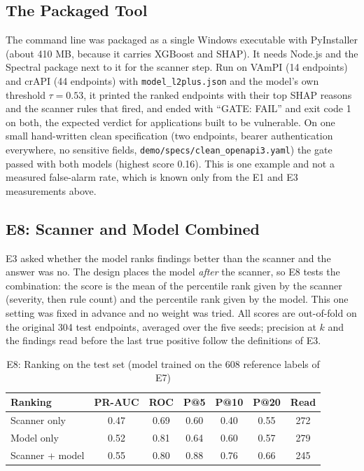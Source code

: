 \documentclass[conference]{IEEEtran}
\begin{document}
\subsection{The Packaged Tool}
The command line was packaged as a single Windows executable with PyInstaller (about 410 MB, because it carries XGBoost and SHAP).
It needs Node.js and the Spectral package next to it for the scanner step. Run on VAmPI (14 endpoints) and crAPI (44 endpoints)
with \texttt{model\_l2plus.json} and the model's own threshold $\tau=0.53$, it printed the ranked endpoints with their top SHAP reasons
and the scanner rules that fired, and ended with ``GATE: FAIL'' and exit code 1 on both, the expected verdict for applications built to
be vulnerable. On one small hand-written clean specification (two endpoints, bearer authentication everywhere, no sensitive fields, \texttt{demo/specs/clean\_openapi3.yaml}) the gate passed with both models (highest score 0.16). This is one example and not a measured false-alarm rate, which is known only from the E1 and E3
measurements above.

\subsection{E8: Scanner and Model Combined}
\label{sec:e8}
E3 asked whether the model ranks findings better than the scanner and the answer was no. The design places the model \emph{after} the scanner, so
E8 tests the combination: the score is the mean of the percentile rank given by the scanner (severity, then rule count) and the percentile rank given by
the model. This one setting was fixed in advance and no weight was tried. All scores are out-of-fold on the original 304 test endpoints, averaged over the five seeds;
precision at $k$ and the findings read before the last true positive follow the definitions of E3.

\begin{table}[!t]
\caption{E8: Ranking on the test set (model trained on the 608 reference labels of E7)}
\label{tab:e8}
\centering
\scriptsize
\begin{tabular}{lcccccc}
\toprule
\textbf{Ranking} & \textbf{PR-AUC} & \textbf{ROC} & \textbf{P@5} & \textbf{P@10} & \textbf{P@20} & \textbf{Read}\\
\midrule
Scanner only & 0.47 & 0.69 & 0.60 & 0.40 & 0.55 & 272\\
Model only & 0.52 & 0.81 & 0.64 & 0.60 & 0.57 & 279\\
Scanner + model & 0.55 & 0.80 & 0.88 & 0.76 & 0.66 & 245\\
\bottomrule
\end{tabular}
\end{table}
\end{document}
